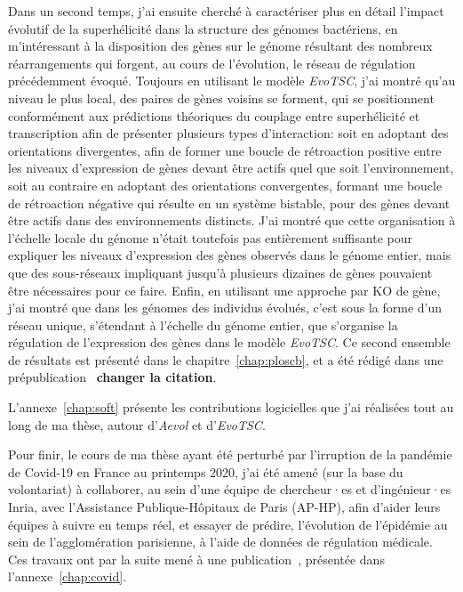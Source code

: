 Dans un second temps, j'ai ensuite cherché à caractériser plus en détail l'impact évolutif de la superhélicité dans la structure des génomes bactériens, en m'intéressant à la disposition des gènes sur le génome résultant des nombreux réarrangements qui forgent, au cours de l'évolution, le réseau de régulation précédemment évoqué.
Toujours en utilisant le modèle \emph{EvoTSC}, j'ai montré qu'au niveau le plus local, des paires de gènes voisins se forment, qui se positionnent conformément aux prédictions théoriques du couplage entre superhélicité et transcription afin de présenter plusieurs types d'interaction: soit en adoptant des orientations divergentes, afin de former une boucle de rétroaction positive entre les niveaux d'expression de gènes devant être actifs quel que soit l'environnement, soit au contraire en adoptant des orientations convergentes, formant une boucle de rétroaction négative qui résulte en un système bistable, pour des gènes devant être actifs dans des environnements distincts.
J'ai montré que cette organisation à l'échelle locale du génome n'était toutefois pas entièrement suffisante pour expliquer les niveaux d'expression des gènes observés dans le génome entier, mais que des sous-réseaux impliquant jusqu'à plusieurs dizaines de gènes pouvaient être nécessaires pour ce faire.
Enfin, en utilisant une approche par KO de gène, j'ai montré que dans les génomes des individus évolués, c'est sous la forme d'un réseau unique, s'étendant à l'échelle du génome entier, que s'organise la régulation de l'expression des gènes dans le modèle \emph{EvoTSC}.
Ce second ensemble de résultats est présenté dans le chapitre~\ref{chap:ploscb}, et a été rédigé dans une prépublication~\citep{grohens2021} \textbf{changer la citation}.

L'annexe~\ref{chap:soft} présente les contributions logicielles que j'ai réalisées tout au long de ma thèse, autour d'\emph{Aevol} et d'\emph{EvoTSC}.

Pour finir, le cours de ma thèse ayant été perturbé par l'irruption de la pandémie de Covid-19 en France au printemps 2020, j'ai été amené (sur la base du volontariat) à collaborer, au sein d'une équipe de chercheur·es et d'ingénieur·es Inria, avec l'Assistance Publique-Hôpitaux de Paris (AP-HP), afin d'aider leurs équipes à suivre en temps réel, et essayer de prédire, l'évolution de l'épidémie au sein de l'agglomération parisienne, à l'aide de données de régulation médicale.
Ces travaux ont par la suite mené à une publication~\citep{gaubert2020}, présentée dans l'annexe~\ref{chap:covid}.


